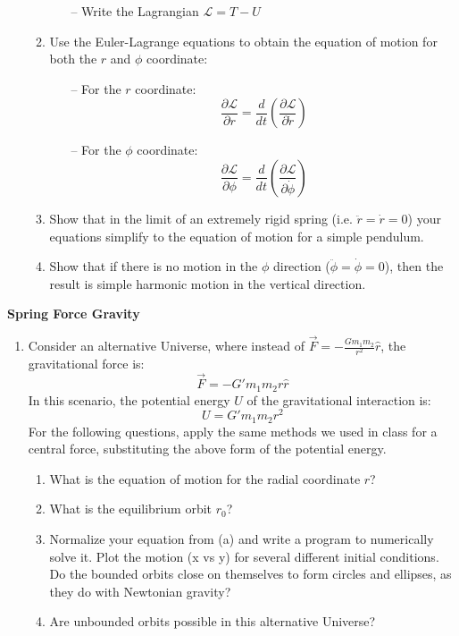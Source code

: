 \documentclass{article}
\begin{document}
\begin{enumerate}
\begin{enumerate}
\begin{enumerate}
			\item[--] Write the Lagrangian $\mathcal{L}=T-U$
		\end{enumerate}
		\item Use the Euler-Lagrange equations to obtain the equation of motion for both the $r$ and $\phi$ coordinate:
		\begin{enumerate}
			\item[--] For the $r$ coordinate: 
			\begin{equation*}
				\frac{\partial \mathcal{L}}{\partial r} = \frac{d}{dt}\left(\frac{\partial\mathcal{L}}{\partial \dot{r}}\right)
			\end{equation*} 
			\item[--] For the $\phi$ coordinate:
			\begin{equation*}
				\frac{\partial \mathcal{L}}{\partial \phi} = \frac{d}{dt}\left(\frac{\partial\mathcal{L}}{\partial \dot{\phi}}\right)
			\end{equation*} 
		\end{enumerate}
	\item Show that in the limit of an extremely rigid spring (i.e. $\ddot{r}=\dot{r}=0$) your equations simplify to the equation of motion for a simple pendulum.
	\item Show that if there is no motion in the $\phi$ direction ($\ddot{\phi}=\dot{\phi}=0$), then the result is simple harmonic motion in the vertical direction.
	\end{enumerate}
\end{enumerate}

{\textbf{Spring Force Gravity}}
\begin{enumerate}[resume]
	\item Consider an alternative Universe, where instead of $\vec{F}=-\frac{Gm_1m_2}{r^2}\hat{r}$, the gravitational force is: 
	\begin{equation*}
		\vec{F}=-G'm_1m_2r\hat{r}
	\end{equation*}
	In this scenario, the potential energy $U$ of the gravitational interaction is:
	\begin{equation*}
		U=G'm_1m_2r^2
	\end{equation*}
	For the following questions, apply the same methods we used in class for a central force, substituting the above form of the potential energy.
	\begin{enumerate}
		\item What is the equation of motion for the radial coordinate $r$?
		\item What is the equilibrium orbit $r_0$?
		\item Normalize your equation from (a) and write a program to numerically solve it. Plot the motion (x vs y) for several different initial conditions. Do the bounded orbits close on themselves to form circles and ellipses, as they do with Newtonian gravity?
		\item Are unbounded orbits possible in this alternative Universe?
	\end{enumerate}
\end{enumerate}
\end{document}
